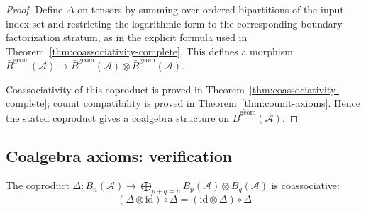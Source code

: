 \begin{proof}
Define $\Delta$ on tensors by summing over ordered bipartitions of the input
index set and restricting the logarithmic form to the corresponding boundary
factorization stratum, as in the explicit formula used in
Theorem~\ref{thm:coassociativity-complete}. This defines a morphism
$\bar{B}^{\mathrm{geom}}(\mathcal{A})\to
\bar{B}^{\mathrm{geom}}(\mathcal{A})\otimes\bar{B}^{\mathrm{geom}}(\mathcal{A})$.

Coassociativity of this coproduct is proved in
Theorem~\ref{thm:coassociativity-complete}; counit compatibility is proved in
Theorem~\ref{thm:counit-axioms}. Hence the stated coproduct gives a coalgebra
structure on $\bar{B}^{\mathrm{geom}}(\mathcal{A})$.
\end{proof}

\subsection{Coalgebra axioms: verification}
\label{subsec:coalgebra-axioms-complete}

\begin{theorem}\label{thm:coassociativity-complete}
The coproduct $\Delta: \bar{B}_n(\mathcal{A}) \to \bigoplus_{p+q=n} \bar{B}_p(\mathcal{A}) \otimes \bar{B}_q(\mathcal{A})$ is coassociative:
\[(\Delta \otimes \text{id}) \circ \Delta = (\text{id} \otimes \Delta) \circ \Delta\]
\end{theorem}

